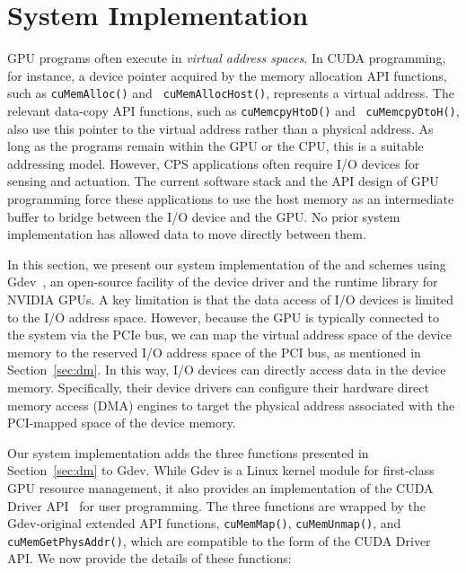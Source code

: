 \section{System Implementation}
\label{sec:implementation}

GPU programs often execute in \textit{virtual address spaces}.
In CUDA programming, for instance, a device pointer acquired by the
memory allocation API functions, such as {\tt cuMemAlloc()} and {\tt
cuMemAllocHost()}, represents a virtual address.
The relevant data-copy API functions, such as {\tt cuMemcpyHtoD()} and {\tt
cuMemcpyDtoH()}, also use this pointer to the virtual address rather
than a physical address.
As long as the programs remain within the GPU or the CPU, this is a
suitable addressing model.
However, CPS applications often require I/O devices for sensing and
actuation.
The current software stack and the API design of GPU programming force
these applications to use the host memory as an intermediate buffer to
bridge between the I/O device and the GPU.
No prior system implementation has allowed data to move directly between
them. 

In this section, we present our system implementation of the {\dm} and
{\dmh} schemes using Gdev~\cite{Kato_ATC12}, an open-source facility of
the device driver and the runtime library for NVIDIA GPUs.
A key limitation is that the data access of I/O devices is limited to
the I/O address space.
However, because the GPU is typically connected to the system via the
PCIe bus, we can map the virtual address space of the device memory to
the reserved I/O address space of the PCI bus, as mentioned in
Section~\ref{sec:dm}.
In this way, I/O devices can directly access data in the device memory.
Specifically, their device drivers can configure their hardware direct
memory access (DMA) engines to target the physical address associated
with the PCI-mapped space of the device memory.

Our system implementation adds the three functions presented in
Section~\ref{sec:dm} to Gdev.
While Gdev is a Linux kernel module for first-class GPU resource
management, it also provides an implementation of the CUDA Driver
API~\cite{CUDA} for user programming.
The three functions are wrapped by the Gdev-original extended API
functions, {\tt cuMemMap()}, {\tt cuMemUnmap()}, and {\tt
cuMemGetPhysAddr()}, which are compatible to the form of the CUDA Driver
API.
We now provide the details of these functions:

